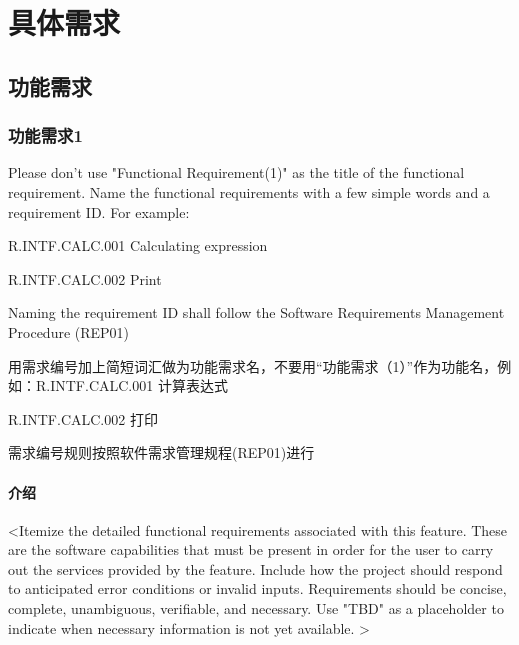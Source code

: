 \chapter{具体需求}

\section{功能需求}



\subsection{功能需求1}
Please don't use "Functional Requirement(1)" as the title of the functional requirement. Name the functional requirements with a few simple words and a requirement ID.  For example:

R.INTF.CALC.001 Calculating expression

R.INTF.CALC.002 Print

Naming the requirement ID shall follow the Software Requirements Management Procedure (REP01)

用需求编号加上简短词汇做为功能需求名，不要用“功能需求（1）”作为功能名，例如：R.INTF.CALC.001 计算表达式

R.INTF.CALC.002 打印

需求编号规则按照软件需求管理规程(REP01)进行
\subsubsection{介绍}
<Itemize the detailed functional requirements associated with this feature. These are the software capabilities that must be present in order for the user to carry out the services provided by the feature.  Include how the project should respond to anticipated error conditions or invalid inputs. Requirements should be concise, complete, unambiguous, verifiable, and necessary. Use "TBD" as a placeholder to indicate when necessary information is not yet available. >

